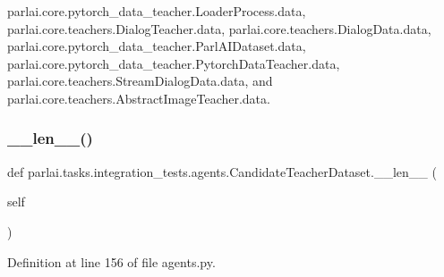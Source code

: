 parlai.\+core.\+pytorch\+\_\+data\+\_\+teacher.\+Loader\+Process.\+data, parlai.\+core.\+teachers.\+Dialog\+Teacher.\+data, parlai.\+core.\+teachers.\+Dialog\+Data.\+data, parlai.\+core.\+pytorch\+\_\+data\+\_\+teacher.\+Parl\+A\+I\+Dataset.\+data, parlai.\+core.\+pytorch\+\_\+data\+\_\+teacher.\+Pytorch\+Data\+Teacher.\+data, parlai.\+core.\+teachers.\+Stream\+Dialog\+Data.\+data, and parlai.\+core.\+teachers.\+Abstract\+Image\+Teacher.\+data.

\mbox{\label{classparlai_1_1tasks_1_1integration__tests_1_1agents_1_1CandidateTeacherDataset_af21b0729758b7ee550cb28f15b637edf}} 
\subsubsection{\texorpdfstring{\+\_\+\+\_\+len\+\_\+\+\_\+()}{\_\_len\_\_()}}
{\footnotesize\ttfamily def parlai.\+tasks.\+integration\+\_\+tests.\+agents.\+Candidate\+Teacher\+Dataset.\+\_\+\+\_\+len\+\_\+\+\_\+ (\begin{DoxyParamCaption}\item[{}]{self }\end{DoxyParamCaption})}



Definition at line 156 of file agents.\+py.



